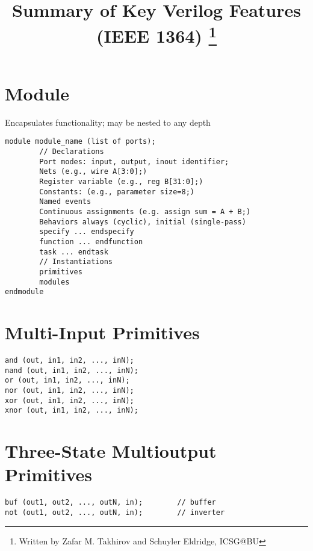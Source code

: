 \documentclass[10pt,twocolumn]{article}
\title{Summary of Key Verilog Features (IEEE 1364) \thanks{Written by Zafar M. Takhirov and Schuyler Eldridge, ICSG@BU}}
\date{\vspace{-5ex}}
\begin{document}
\setlength{\columnsep}{0.5in}
\setlength{\columnseprule}{0.5pt}
\maketitle
%
\lstset{
        language=Verilog,
        stepnumber=1, 
        numbersep=5pt,
        basicstyle=\ttfamily,
        frame=single,}  
%       
\section*{Module}\vspace{-10pt}
Encapsulates functionality; may be nested to any depth
\begin{lstlisting}
module module_name (list of ports);
        // Declarations
        Port modes: input, output, inout identifier;
        Nets (e.g., wire A[3:0];)
        Register variable (e.g., reg B[31:0];)
        Constants: (e.g., parameter size=8;)
        Named events
        Continuous assignments (e.g. assign sum = A + B;)
        Behaviors always (cyclic), initial (single-pass)
        specify ... endspecify
        function ... endfunction
        task ... endtask
        // Instantiations
        primitives
        modules
endmodule
\end{lstlisting}
%
\section*{Multi-Input Primitives}\vspace{-10pt}
\begin{lstlisting}
and (out, in1, in2, ..., inN);
nand (out, in1, in2, ..., inN);
or (out, in1, in2, ..., inN);
nor (out, in1, in2, ..., inN);
xor (out, in1, in2, ..., inN);
xnor (out, in1, in2, ..., inN);
\end{lstlisting}
%
\section*{Three-State  Multioutput Primitives}\vspace{-10pt}
\begin{lstlisting}
buf (out1, out2, ..., outN, in);        // buffer
not (out1, out2, ..., outN, in);        // inverter
\end{lstlisting}
%
\end{document}
